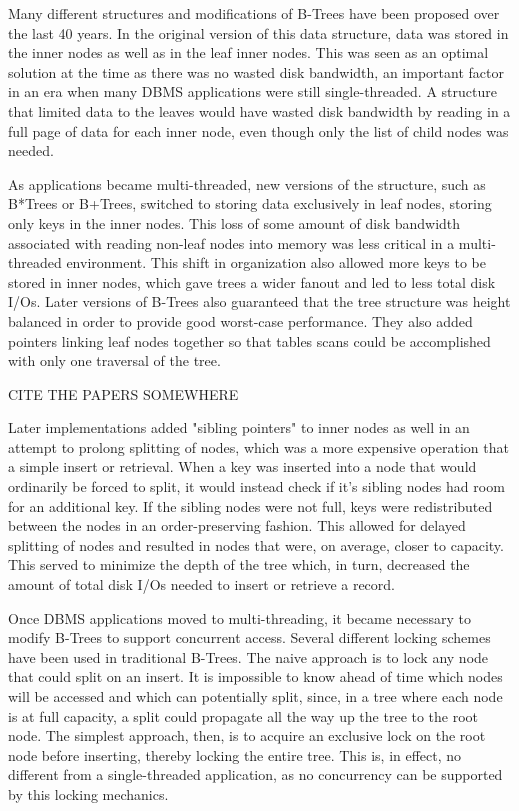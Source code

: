 \documentclass{sig-alternate}
\begin{document}
Many different structures and modifications of B-Trees have been proposed over the last 40 years.  In the original version of this data structure, data was stored in the inner nodes as well as in the leaf inner nodes.  This was seen as an optimal solution at the time as there was no wasted disk bandwidth, an important factor in an era when many DBMS applications were still single-threaded. A structure that limited data to the leaves would have wasted disk bandwidth by reading in a full page of data for each inner node, even though only the list of child nodes was needed. 

As applications became multi-threaded, new versions of the structure, such as B*Trees or B+Trees, switched to storing data exclusively in leaf nodes, storing only keys in the inner nodes. This loss of some amount of disk bandwidth associated with reading non-leaf nodes into memory was less critical in a multi-threaded environment. This shift in organization also allowed more keys to be stored in inner nodes, which gave trees a wider fanout and led to less total disk I/Os. Later versions of B-Trees also guaranteed that the tree structure was height balanced in order to provide good worst-case performance. They also added pointers linking leaf nodes together so that tables scans could be accomplished with only one traversal of the tree.  

CITE THE PAPERS SOMEWHERE

Later implementations added "sibling pointers" to inner nodes as well in an attempt to prolong splitting of nodes, which was a more expensive operation that a simple insert or retrieval. When a key was inserted into a node that would ordinarily be forced to split, it would instead check if it's sibling nodes had room for an additional key. If the sibling nodes were not full, keys were redistributed between the nodes in an order-preserving fashion. This allowed for delayed splitting of nodes and resulted in nodes that were, on average, closer to capacity. This served to minimize the depth of the tree which, in turn, decreased the amount of total disk I/Os needed to insert or retrieve a record.

Once DBMS applications moved to multi-threading, it became necessary to modify B-Trees to support concurrent access.  Several different locking schemes have been used in traditional B-Trees. The naive approach is to lock any node that could split on an insert.  It is impossible to know ahead of time which nodes will be accessed and which can potentially split, since, in a tree where each node is at full capacity, a split could propagate all the way up the tree to the root node. The simplest approach, then, is to acquire an exclusive lock on the root node before inserting, thereby locking the entire tree\cite{graefe:survey}. This is, in effect, no different from a single-threaded application, as no concurrency can be supported by this locking mechanics.
\end{document}
